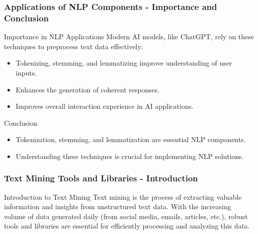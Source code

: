 \documentclass[aspectratio=169]{beamer}
\begin{document}
\begin{frame}[fragile]
    \frametitle{Applications of NLP Components - Importance and Conclusion}
    \begin{block}{Importance in NLP Applications}
        Modern AI models, like ChatGPT, rely on these techniques to preprocess text data effectively:
    \end{block}
    \begin{itemize}
        \item Tokenizing, stemming, and lemmatizing improve understanding of user inputs.
        \item Enhances the generation of coherent responses.
        \item Improves overall interaction experience in AI applications.
    \end{itemize}

    \begin{block}{Conclusion}
        \begin{itemize}
            \item Tokenization, stemming, and lemmatization are essential NLP components.
            \item Understanding these techniques is crucial for implementing NLP solutions.
        \end{itemize}
    \end{block}
\end{frame}

\begin{frame}[fragile]
  \frametitle{Text Mining Tools and Libraries - Introduction}
  \begin{block}{Introduction to Text Mining}
    Text mining is the process of extracting valuable information and insights from unstructured text data. 
    With the increasing volume of data generated daily (from social media, emails, articles, etc.), robust tools and libraries are essential for efficiently processing and analyzing this data.
  \end{block}
\end{frame}
\end{document}
